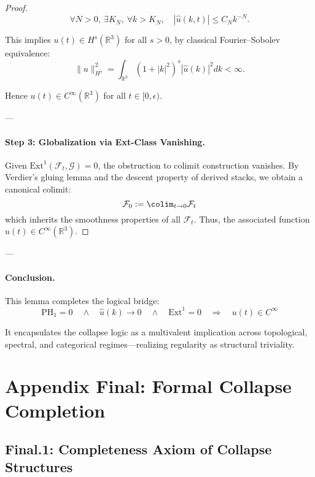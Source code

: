 \documentclass[11pt]{article}
\begin{document}
\begin{axiom}
\begin{axiom}
{{\begin{proof}
\[
\forall N > 0,\ \exists K_N,\ \forall k > K_N,\quad
|\widehat{u}(k, t)| \leq C_N k^{-N}.
\]

This implies \( u(t) \in H^s(\mathbb{R}^3) \) for all \( s > 0 \),  
by classical Fourier–Sobolev equivalence:
\[
\| u \|_{H^s}^2 = \int_{\mathbb{R}^3} (1 + |k|^2)^s |\widehat{u}(k)|^2 dk < \infty.
\]

Hence \( u(t) \in C^\infty(\mathbb{R}^3) \) for all \( t \in [0, \epsilon) \).

---

\paragraph{Step 3: Globalization via Ext-Class Vanishing.}
Given \( \mathrm{Ext}^1(\mathcal{F}_t, \mathcal{G}) = 0 \),  
the obstruction to colimit construction vanishes.  
By Verdier’s gluing lemma and the descent property of derived stacks,  
we obtain a canonical colimit:
\[
\mathcal{F}_0 := \colim_{t \to 0} \mathcal{F}_t
\]
which inherits the smoothness properties of all \( \mathcal{F}_t \).  
Thus, the associated function \( u(t) \in C^\infty(\mathbb{R}^3) \).

\end{proof}

---

\paragraph{Conclusion.}
This lemma completes the logical bridge:
\[
\boxed{
\mathrm{PH}_1 = 0 \quad \wedge \quad \widehat{u}(k) \to 0 \quad \wedge \quad \mathrm{Ext}^1 = 0
\quad \Longrightarrow \quad u(t) \in C^\infty
}
\]

It encapsulates the collapse logic as a multivalent implication  
across topological, spectral, and categorical regimes—realizing regularity as structural triviality.




\section*{Appendix Final: Formal Collapse Completion}

\subsection*{Final.1: Completeness Axiom of Collapse Structures}

}}
\end{axiom}
\end{axiom}
\end{document}
